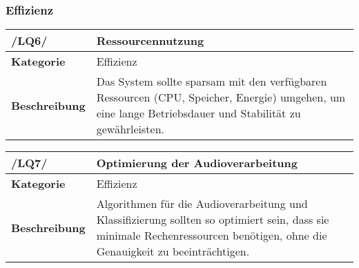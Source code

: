 \newpage
\subsubsection{Effizienz}

\begin{table}[h!]
	\begin{tabularx}{\textwidth}{|l|X|}
		\hline
		\textbf{/LQ6/} & \textbf{Ressourcennutzung} \\ \hline
		\textbf{Kategorie} & Effizienz \\ \hline
		\textbf{Beschreibung} & Das System sollte sparsam mit den verfügbaren Ressourcen (CPU, Speicher, Energie) umgehen, um eine lange Betriebsdauer und Stabilität zu gewährleisten. \\ \hline
	\end{tabularx}
\end{table}

\begin{table}[h!]
	\begin{tabularx}{\textwidth}{|l|X|}
		\hline
		\textbf{/LQ7/} & \textbf{Optimierung der Audioverarbeitung} \\ \hline
		\textbf{Kategorie} & Effizienz \\ \hline
		\textbf{Beschreibung} & Algorithmen für die Audioverarbeitung und Klassifizierung sollten so optimiert sein, dass sie minimale Rechenressourcen benötigen, ohne die Genauigkeit zu beeinträchtigen. \\ \hline
	\end{tabularx}
\end{table}